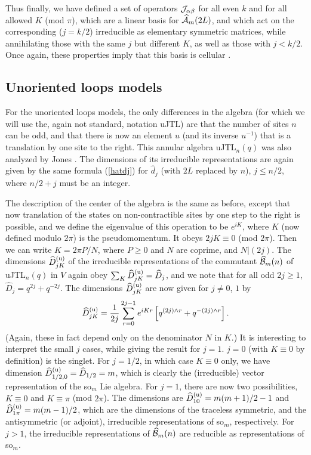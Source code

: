 \documentclass[twocolumn,floats,pra]{revtex4}
\def \hcA {\widehat{\cal A}}
\newcommand {\be}{\begin{equation}}
\newcommand {\ee} {\end{equation}}
\begin{document}
Thus finally, we have defined a set of operators ${\cal
J}_{\alpha\beta}$ for all even $k$ and for all allowed $K$ (mod
$\pi$), which are a linear basis for $\hcA_m(2L)$, and which act
on the corresponding ($j=k/2$) irreducible as elementary symmetric
matrices, while annihilating those with the same $j$ but different
$K$, as well as those with $j<k/2$. Once again, these properties
imply that this basis is cellular \cite{gl,mathas}.



\subsection{Unoriented loops models}

For the unoriented loops models, the only differences in the
algebra (for which we will use the, again not standard, notation
uJTL) are that the number of sites $n$ can be odd, and that there
is now an element $u$ (and its inverse $u^{-1}$) that is a
translation by one site to the right. This annular algebra
uJTL$_n(q)$ was also analyzed by Jones \cite{jones2}. The
dimensions of its irreducible representations are again given by
the same formula (\ref{hatdj}) for $\widehat{d}_j$ (with $2L$
replaced by $n$), $j\leq n/2$, where $n/2+j$ must be an integer.

The description of the center of the algebra is the same as
before, except that now translation of the states on
non-contractible sites by one step to the right is possible, and
we define the eigenvalue of this operation to be $e^{iK}$, where
$K$ (now defined modulo $2\pi$) is the pseudomomentum. It obeys
$2jK\equiv0$ (mod $2\pi$). Then we can write $K=2\pi P/N$, where
$P\geq0$ and $N$ are coprime, and $N|(2j)$. The dimensions
$\widehat{D}^{({\rm u})}_{jK}$ of the irreducible representations
of the commutant $\widehat{\cal B}_m(n)$ of uJTL$_n(q)$ in $V$
again obey $\sum_K \widehat{D}^{({\rm u})}_{jK}=\widehat{D}_j$,
and we note that for all odd $2j\geq 1$,
$\widehat{D}_j=q^{2j}+q^{-2j}$. The dimensions $\widehat{D}^{({\rm
u})}_{jK}$ are now given for $j\neq0$, $1$ by
\cite{jones2}%
\be%
\widehat{D}^{({\rm u})}_{jK}
=\frac{1}{2j}\sum_{r=0}^{2j-1}e^{iKr}\left[q^{(2j)\wedge
r}+q^{-(2j)\wedge r}\right].\ee %
(Again, these in fact depend only on the denominator $N$ in $K$.)
It is interesting to interpret the small $j$ cases, while giving
the result for $j=1$. $j=0$ (with $K\equiv0$ by definition) is the
singlet. For $j=1/2$, in which case $K\equiv0$ only, we have
dimension $\widehat{D}^{({\rm u})}_{1/2,0}=\widehat{D}_{1/2}=m$,
which is clearly the (irreducible) vector representation of the
so$_m$ Lie algebra. For $j=1$, there are now two possibilities,
$K\equiv0$ and $K\equiv \pi$ (mod $2\pi$). The dimensions are
$\widehat{D}^{({\rm u})}_{10}=m(m+1)/2-1$ and $\widehat{D}^{({\rm
u})}_{1\pi}=m(m-1)/2$, which are the dimensions of the traceless
symmetric, and the antisymmetric (or adjoint), irreducible
representations of so$_m$, respectively. For $j>1$, the
irreducible representations of $\widehat{\cal B}_m(n)$ are
reducible as representations of so$_m$.
\end{document}
